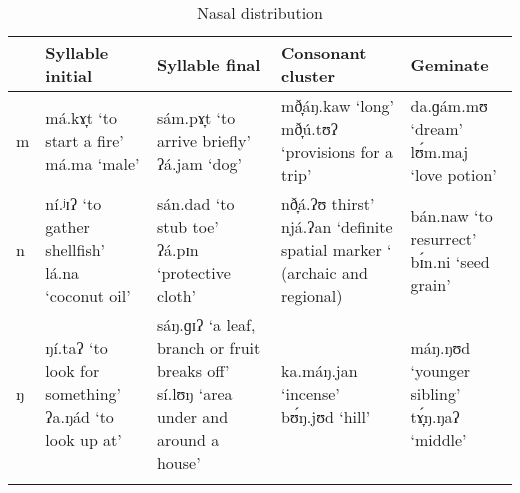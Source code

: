 \begin{table}
\caption{Nasal distribution}
\label{tab2.4}
\begin{tabularx}{\textwidth}{lQQQQ}
\lsptoprule
& Syllable initial & Syllable final & Consonant cluster & Geminate \\
\midrule
m & má.kɤ̞t \newline ‘to start a fire’
\newline
má.ma \newline ‘male’ &
sám.pɤ̞t \newline ‘to arrive briefly’
\newline
ʔá.jam \newline ‘dog’ &
mð̞áŋ.kaw \newline ‘long’
\newline
mð̞ú.tʊʔ \newline ‘provisions for a trip’ &
da.ɡám.mʊ \newline ‘dream’
\newline
lʊ́m.maj \newline ‘love potion’ \\
\tablevspace
n & ní.ʲɪʔ \newline ‘to gather shellfish’
\newline
lá.na \newline ‘coconut oil’ &
sán.dad \newline ‘to stub toe’
\newline
ʔá.pɪn \newline ‘protective cloth’ &
nð̞á.ʔʊ thirst’
\newline
njá.ʔan \newline ‘definite spatial marker \newline ‘ (archaic and regional) &
bán.naw \newline ‘to resurrect’
\newline
bɪ́n.ni \newline ‘seed grain’ \\
\tablevspace
ŋ & ŋí.taʔ \newline ‘to look for something’
\newline
ʔa.ŋád \newline ‘to look up at’ &
sáŋ.ɡɪʔ \newline ‘a leaf, branch or fruit breaks off’
\newline
sí.lʊŋ  \newline ‘area under and around a house’ &
ka.máŋ.jan \newline ‘incense’
\newline
bʊ́ŋ.jʊd \newline ‘hill’ &
máŋ.ŋʊd \newline ‘younger sibling’
\newline
tɤ̞́ŋ.ŋaʔ \newline ‘middle’ \\
\lspbottomrule
\end{tabularx}
\end{table}

